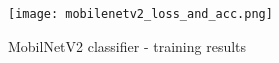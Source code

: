 

\begin{figure}
    \centering
    \texttt{[image: mobilenetv2\_loss\_and\_acc.png]}
    \caption{MobilNetV2 classifier - training results}
    \label{fig:mobilenetv2}
\end{figure}
